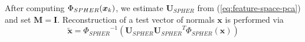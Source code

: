 After computing $\Phi_{SPHER}(\boldsymbol{x}_k)$, we estimate $\boldsymbol{U}_{SPHER}$ from (\ref{eq:feature-space-pca}) and set $\boldsymbol{M} = \boldsymbol{I}$. Reconstruction of a test vector of normals $\boldsymbol{x}$ is performed via
\begin{equation}\label{eq:spher-reconstruction}
   \tilde{\boldsymbol{x}} = {\Phi_{SPHER}}^{-1} \left( \boldsymbol{U}_{SPHER} {\boldsymbol{U}_{SPHER}}^T \Phi_{SPHER}(\boldsymbol{x}) \right)
\end{equation}
